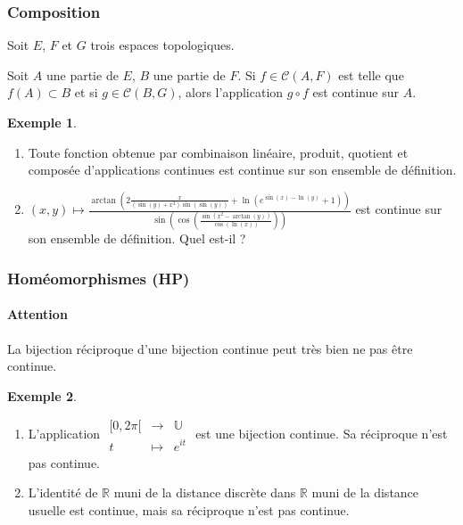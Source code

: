 \documentclass[french]{article}
\newcommand{\R}{\mathbb{R}}
\newcommand{\U}{\mathbb{U}}
\theoremstyle{plain}
\theoremstyle{definition}
\newtheorem*{ex}{Exemple}
\theoremstyle{remark}
\begin{document}
\subsubsection*{Composition}

Soit $E$, $F$ et $G$ trois espaces topologiques.

\begin{thm}{}%
	Soit $A$ une partie de $E$, $B$ une partie de $F$. Si $f\in\mathcal{C}(A,F)$ est telle que $f(A)\subset B$ et si $g\in\mathcal{C}(B,G)$, alors l'application $g\circ f$ est continue sur $A$.
\end{thm}

\begin{ex}
	\begin{enumerate}
		\item Toute fonction obtenue par combinaison linéaire, produit, quotient et composée d'applications continues est continue sur son ensemble de définition.
		\item $\displaystyle (x,y)\mapsto\frac{\arctan\left(2\frac{x}{(\sin(y)+x^2)\sin(\sin(y))}+\ln(e^{\sin(x)-\ln(y)}+1)\right)}{\sin\left(\cos\left(\frac{\sin(x^2-\arctan(y))}{\cos(\ln(x))}\right)\right)}$ est continue sur son ensemble de définition. Quel est-il ?
	\end{enumerate}
\end{ex}

\subsubsection*{Homéomorphismes (HP)}

\paragraph{Attention} La bijection réciproque d'une bijection continue peut très bien ne pas être continue.

\begin{ex}
	\begin{enumerate}
		\item L'application $\begin{array}{rcl}
			[0,2\pi[&\longrightarrow&\U\\
			t&\longmapsto&e^{it}
		\end{array}$ est une bijection continue. Sa réciproque n'est pas continue.
		\item L'identité de $\R$ muni de la distance discrète dans $\R$ muni de la distance usuelle est continue, mais sa réciproque n'est pas continue.
	\end{enumerate}
\end{ex}
\end{document}
